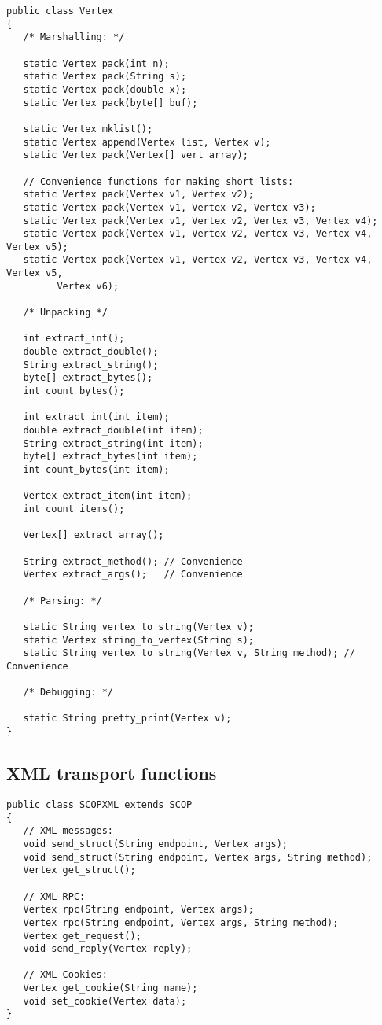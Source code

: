 \documentclass[12pt,a4paper,twoside]{article}
\renewcommand{\_}{\texttt{\symbol{95}}}
\begin{document}
\begin{verbatim}
public class Vertex
{
   /* Marshalling: */

   static Vertex pack(int n);
   static Vertex pack(String s);
   static Vertex pack(double x);
   static Vertex pack(byte[] buf);
   
   static Vertex mklist();
   static Vertex append(Vertex list, Vertex v);
   static Vertex pack(Vertex[] vert_array);

   // Convenience functions for making short lists:
   static Vertex pack(Vertex v1, Vertex v2);
   static Vertex pack(Vertex v1, Vertex v2, Vertex v3);
   static Vertex pack(Vertex v1, Vertex v2, Vertex v3, Vertex v4);
   static Vertex pack(Vertex v1, Vertex v2, Vertex v3, Vertex v4, Vertex v5);
   static Vertex pack(Vertex v1, Vertex v2, Vertex v3, Vertex v4, Vertex v5,
         Vertex v6);

   /* Unpacking */

   int extract_int();
   double extract_double();
   String extract_string();
   byte[] extract_bytes();
   int count_bytes();

   int extract_int(int item);
   double extract_double(int item);
   String extract_string(int item);
   byte[] extract_bytes(int item);
   int count_bytes(int item);

   Vertex extract_item(int item);
   int count_items();

   Vertex[] extract_array();

   String extract_method(); // Convenience
   Vertex extract_args();   // Convenience

   /* Parsing: */

   static String vertex_to_string(Vertex v);
   static Vertex string_to_vertex(String s);
   static String vertex_to_string(Vertex v, String method); // Convenience

   /* Debugging: */

   static String pretty_print(Vertex v);
}
\end{verbatim}

\subsection{XML transport functions}

\begin{verbatim}
public class SCOPXML extends SCOP
{
   // XML messages:
   void send_struct(String endpoint, Vertex args);
   void send_struct(String endpoint, Vertex args, String method);
   Vertex get_struct();
   
   // XML RPC:
   Vertex rpc(String endpoint, Vertex args);
   Vertex rpc(String endpoint, Vertex args, String method);
   Vertex get_request();
   void send_reply(Vertex reply);
   
   // XML Cookies:
   Vertex get_cookie(String name);
   void set_cookie(Vertex data);
}
\end{verbatim}
\end{document}
